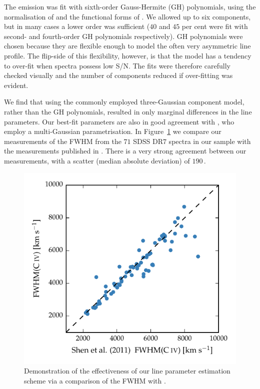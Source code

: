 The  emission was fit with sixth-order Gauss-Hermite (GH) polynomials, using the normalisation of \citet{marel93} and the functional forms of \citet{cappellari02}.
We allowed up to six components, but in many cases a lower order was sufficient ($40$ and $45$ per cent were fit with second- and fourth-order GH polynomials respectively).
GH polynomials were chosen because they are flexible enough to model the often very asymmetric  line profile.
The flip-side of this flexibility, however, is that the model has a tendency to over-fit when spectra possess low S/N.
The fits were therefore carefully checked visually and the number of components reduced if over-fitting was evident.

We find that using the commonly employed three-Gaussian component model, rather than the GH polynomials, resulted in only marginal differences in the line parameters.
Our best-fit parameters are also in good agreement with \citet{shen11}, who employ a multi-Gaussian parametrisation.
In Figure~\ref{fig:shen_comparison_civ} we compare our measurements of the  FWHM from the $71$ SDSS DR$7$ spectra in our sample with the measurements published in \citet{shen11}.
There is a very strong agreement between our measurements, with a scatter (median absolute deviation) of $190$\,\kms.

\begin{figure}
    \centering
    \includegraphics[width=0.8\linewidth]{figures/chapter03/shen_comparison_civ.pdf}
    \caption[{Demonstration of the effectiveness of  line parameter estimation scheme.}]{Demonstration of the effectiveness of our line parameter estimation scheme via a comparison of the  FWHM with \citet{shen11}.}
    \label{fig:shen_comparison_civ}
\end{figure}

